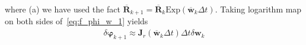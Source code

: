 where (a) we have used the fact $\overline{\mathbf{R}}_{k+1} = \overline{\mathbf{R}}_{k} \mathrm{Exp}(\overline{\mathbf{w}}_k \Delta{t})$. Taking logarithm map on both sides of~\eqref{eq:f_phi_w_1} yields
\begin{align}
\label{eq:f_phi_w_2}
\delta{\boldsymbol{\varphi}}_{k+1} \approx \mathbf{J}_r(\overline{\mathbf{w}}_{k} \Delta{t})\Delta{t} \delta{\mathbf{w}_{k}} 
\end{align}

